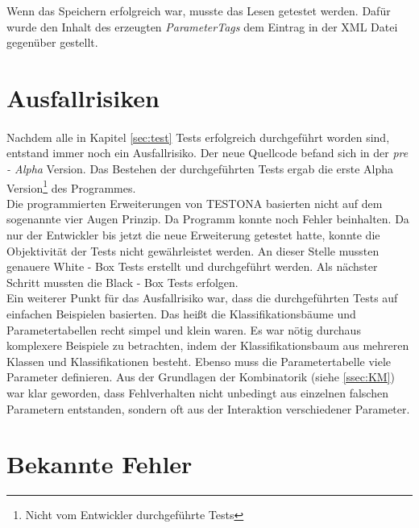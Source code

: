 Wenn das Speichern erfolgreich war, musste das Lesen getestet werden. Dafür wurde den Inhalt des erzeugten \textit{ParameterTags} dem Eintrag in der XML Datei gegenüber gestellt.



\newpage
\section{Ausfallrisiken}
\paragraph{}
Nachdem alle in Kapitel \ref{sec:test} Tests erfolgreich durchgeführt worden sind, entstand immer noch ein Ausfallrisiko. Der neue Quellcode befand sich in der \textit{pre - Alpha} Version. Das Bestehen der durchgeführten Tests ergab die erste Alpha Version\footnote{Nicht vom Entwickler durchgeführte Tests} des Programmes.\\


Die programmierten Erweiterungen von TESTONA basierten nicht auf dem sogenannte \glqq vier Augen Prinzip\grqq. Da Programm konnte noch Fehler beinhalten. Da nur der Entwickler bis jetzt die neue Erweiterung getestet hatte, konnte die Objektivität der Tests nicht gewährleistet werden. An dieser Stelle mussten genauere White - Box Tests erstellt und durchgeführt werden. Als nächster Schritt mussten die Black - Box Tests erfolgen.\\


Ein weiterer Punkt für das Ausfallrisiko war, dass die durchgeführten Tests auf einfachen Beispielen basierten. Das heißt die Klassifikationsbäume und Parametertabellen recht simpel und klein waren. Es war nötig durchaus komplexere Beispiele zu betrachten, indem der Klassifikationsbaum aus mehreren Klassen und Klassifikationen besteht. Ebenso muss die Parametertabelle viele Parameter definieren. Aus der Grundlagen der Kombinatorik (siehe \ref{ssec:KM}) war klar geworden, dass Fehlverhalten nicht unbedingt aus einzelnen falschen Parametern entstanden, sondern oft aus der Interaktion verschiedener Parameter.


\newpage
\section{Bekannte Fehler}
